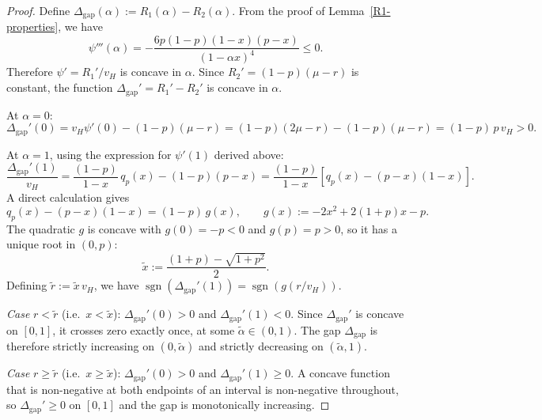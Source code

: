\documentclass[11pt]{article}
\theoremstyle{plain}
\theoremstyle{definition}
\theoremstyle{plain}
\theoremstyle{plain}
\theoremstyle{plain}
\theoremstyle{plain}
\numberwithin{equation}{section}
\begin{document}
\begin{proof}
    Define $\Delta_{\mathrm{gap}}(\alpha) := R_1(\alpha) - R_2(\alpha)$. From the proof of Lemma~\ref{R1-properties}, we have
    \begin{equation*}
        \psi'''(\alpha) = - \frac{6p(1-p)(1-x)(p-x)}{(1-\alpha x)^4} \leq 0.
    \end{equation*}
    Therefore $\psi' = R_1'/v_H$ is concave in $\alpha$. Since $R_2' = (1-p)(\mu - r)$ is constant, the function $\Delta_{\mathrm{gap}}' = R_1' - R_2'$ is concave in $\alpha$.

    \vspace{2mm}

    \noindent At $\alpha = 0$:
    \begin{equation*}
        \Delta_{\mathrm{gap}}'(0) = v_H \psi'(0) - (1-p)(\mu - r) = (1-p)(2\mu - r) - (1-p)(\mu - r) = (1-p) \, p \, v_H > 0.
    \end{equation*}

    \noindent At $\alpha = 1$, using the expression for $\psi'(1)$ derived above:
    \begin{equation*}
        \frac{\Delta_{\mathrm{gap}}'(1)}{v_H} = \frac{(1-p)}{1-x} \, q_p(x) - (1-p)(p - x) = \frac{(1-p)}{1-x} \left[ q_p(x) - (p-x)(1-x) \right].
    \end{equation*}
    A direct calculation gives
    \begin{equation*}
        q_p(x) - (p-x)(1-x) = (1-p) \, g(x), \qquad g(x) := -2x^2 + 2(1+p)x - p.
    \end{equation*}
    The quadratic $g$ is concave with $g(0) = -p < 0$ and $g(p) = p > 0$, so it has a unique root in $(0,p)$:
    \begin{equation*}
        \tilde{x} := \frac{(1+p) - \sqrt{1+p^2}}{2}.
    \end{equation*}
    Defining $\tilde{r} := \tilde{x} \, v_H$, we have $\operatorname{sgn}\!\left(\Delta_{\mathrm{gap}}'(1)\right) = \operatorname{sgn}\!\left(g(r/v_H)\right)$.

    \vspace{2mm}

    \noindent \textit{Case} $r < \tilde{r}$ (i.e.\ $x < \tilde{x}$): $\Delta_{\mathrm{gap}}'(0) > 0$ and $\Delta_{\mathrm{gap}}'(1) < 0$. Since $\Delta_{\mathrm{gap}}'$ is concave on $[0,1]$, it crosses zero exactly once, at some $\tilde{\alpha} \in (0,1)$. The gap $\Delta_{\mathrm{gap}}$ is therefore strictly increasing on $(0, \tilde{\alpha})$ and strictly decreasing on $(\tilde{\alpha}, 1)$.

    \vspace{2mm}

    \noindent \textit{Case} $r \geq \tilde{r}$ (i.e.\ $x \geq \tilde{x}$): $\Delta_{\mathrm{gap}}'(0) > 0$ and $\Delta_{\mathrm{gap}}'(1) \geq 0$. A concave function that is non-negative at both endpoints of an interval is non-negative throughout, so $\Delta_{\mathrm{gap}}' \geq 0$ on $[0,1]$ and the gap is monotonically increasing.
\end{proof}
\vspace{0.4cm}
\end{document}
